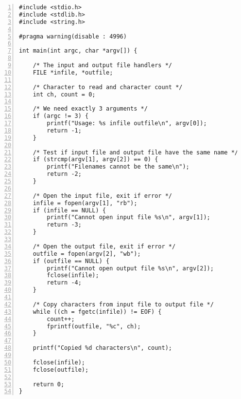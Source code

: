 \documentclass[a4paper,12pt]{article}
\begin{document}
\begin{lstlisting}[numbers=left]
#include <stdio.h>
#include <stdlib.h>
#include <string.h>

#pragma warning(disable : 4996)

int main(int argc, char *argv[]) {

    /* The input and output file handlers */
    FILE *infile, *outfile;

    /* Character to read and character count */
    int ch, count = 0;

    /* We need exactly 3 arguments */
    if (argc != 3) {
        printf("Usage: %s infile outfile\n", argv[0]);
        return -1;
    }

    /* Test if input file and output file have the same name */
    if (strcmp(argv[1], argv[2]) == 0) {
        printf("Filenames cannot be the same\n");
        return -2;
    }

    /* Open the input file, exit if error */
    infile = fopen(argv[1], "rb");
    if (infile == NULL) {
        printf("Cannot open input file %s\n", argv[1]);
        return -3;
    }

    /* Open the output file, exit if error */
    outfile = fopen(argv[2], "wb");
    if (outfile == NULL) {
        printf("Cannot open output file %s\n", argv[2]);
        fclose(infile);
        return -4;
    }

    /* Copy characters from input file to output file */
    while ((ch = fgetc(infile)) != EOF) {
        count++;
        fprintf(outfile, "%c", ch);
    }

    printf("Copied %d characters\n", count);

    fclose(infile);
    fclose(outfile);

    return 0;
}
\end{lstlisting}
\end{document}

